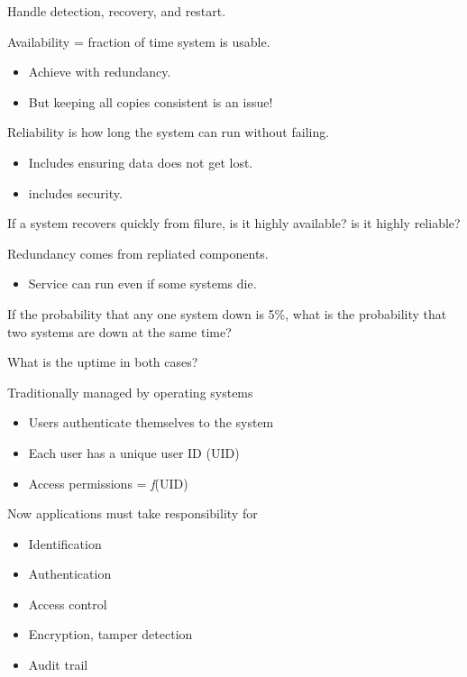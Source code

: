 \begin{slide}

	
	Handle detection, recovery, and restart.
	\bigskip
	
	Availability = fraction of time system is usable.
	\begin{itemize}
		\item Achieve with redundancy.
		\item But keeping all copies consistent is an issue!
	\end{itemize}
	\bigskip
	
	Reliability is how long the system can run without failing.
	\begin{itemize}
		\item Includes ensuring data does not get lost.
		\item includes security.
	\end{itemize}
	\bigskip
	
	If a system recovers quickly from filure, is it highly available? is it highly reliable?
	
\end{slide}

\begin{slide}
	
	
	Redundancy comes from repliated components.
	\begin{itemize}
		\item Service can run even if some systems die.
	\end{itemize}
	\bigskip
	
	If the probability that any one system down is 5\%, what is the probability that two systems are down at the same time?
	\bigskip
	
	What is the uptime in both cases?
	
\end{slide}

\begin{slide}

	
	Traditionally managed by operating systems
	\begin{itemize}
		\item Users authenticate themselves to the system
		\item Each user has a unique user ID (UID)
		\item Access permissions = \textit{f}(UID)
	\end{itemize}
	\bigskip
	
	Now applications must take responsibility for
	\begin{itemize}
		\item Identification
		\item Authentication
		\item Access control
		\item Encryption, tamper detection
		\item Audit trail
	\end{itemize}
	
\end{slide}

